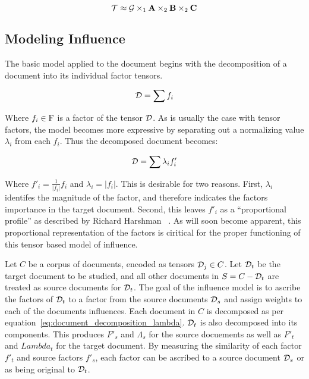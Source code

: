 \documentclass[../dissertation.tex]{subfiles}
\begin{document}
\begin{equation}\label{eq:tucker_decomposition}
  \mathcal{T} \approx \mathcal{G} \times_1 \mathrm{\bf A} \times_2 \mathrm{\bf B} \times_2
  \mathrm{\bf C}
\end{equation}



\subsection{Modeling Influence}
The basic model applied to the document begins with the decomposition
of a document into its individual factor tensors.

\begin{equation} \label{eq:document_decomposition}
  \mathcal{D} = \sum f_i 
\end{equation}

Where $f_i\in \mathrm{F}$ is a factor of the tensor $\mathcal{D}$.  As is
usually the case with tensor factors, the model becomes more
expressive by separating out a normalizing value $\lambda_i$ from each
$f_i$.  Thus the decomposed document becomes:

\begin{equation} \label{eq:document_decomposition_normal}
  \mathcal{D} = \sum \lambda_i f'_i
\end{equation}

Where $f'_i=\frac{1}{|f_i|} f_i$ and $\lambda_i = |f_i|$.  This is
desirable for two reasons.  First, $\lambda_i$ identifes the magnitude
of the factor, and therefore indicates the factors importance in the
target document.  Second, this leaves $f'_i$ as a ``proportional
profile'' as described by Richard Harshman~\cite{harshman1970} . As
will soon become apparent, this proportional representation of the
factors is ciritical for the proper functioning of this tensor based
model of influence.

Let $C$ be a corpus of documents, encoded as tensors $\mathcal{D}_j
\in C$.  Let $\mathcal{D}_t$ be the target document to be studied, and
all other documents in $S=C - \mathcal{D}_t$ are treated as source
documents for $\mathcal{D}_t$.  The goal of the influence model is to
ascribe the factors of $\mathcal{D}_t$ to a factor from the source
documents $\mathcal{D}_s$ and assign weights to each of the documents
influences. Each document in $C$ is decomposed as per
equation~\ref{eq:document_decomposition_lambda}.  $\mathcal{D}_t$ is
also decomposed into its components.  This produces $F'_s$ and
$\Lambda_s$ for the source docuements as well as $F'_t$ and $Lambda_t$
for the target document.  By measuring the similarity of each factor
$f'_t$ and source factors $f'_s$, each factor can be ascribed to a
source document $\mathcal{D}_s$ or as being original to
$\mathcal{D}_t$.
\end{document}
